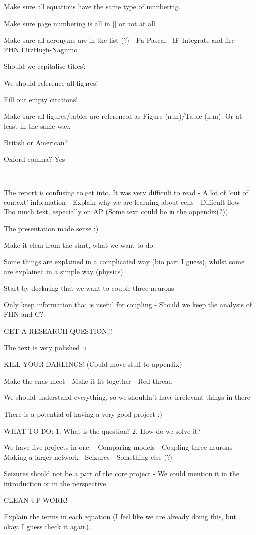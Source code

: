 Make sure all equations have the same type of numbering.

Make sure page numbering is all in [] or not at all

Make sure all acronyms are in the list (?)
    - Pa    Pascal
    - IF    Integrate and fire
    - FHN   FitzHugh-Nagumo

Should we capitalise titles?

We should reference all figures!

Fill out empty citations!

Make sure all figures/tables are referenced as Figure (n.m)/Table (n.m). Or at least in the same way.

British or American?

Oxford comma? Yes

---------------------------------------

The report is confusing to get into. It was very difficult to read
    - A lot of 'out of context' information
    - Explain why we are learning about cells
    - Difficult flow
    - Too much text, especially on AP (Some text could be in    the appendix(?))

The presentation made sense :)

Make it clear from the start, what we want to do

Some things are explained in a complicated way (bio part I guess), whilst some are explained in a simple way (physics)

Start by declaring that we want to couple three neurons 

Only keep information that is useful for coupling
    - Should we keep the analysis of FHN and C?

GET A RESEARCH QUESTION!!!

The text is very polished :)

KILL YOUR DARLINGS! (Could move stuff to appendix)

Make the ends meet
    - Make it fit together 
    - Red thread

We should understand everything, so we shouldn't have irrelevant things in there

There is a potential of having a very good project :)

WHAT TO DO:
    1. What is the question?
    2. How do we solve it?

We have five projects in one:
    - Comparing models
    - Coupling three neurons
    - Making a larger network
    - Seizures
    - Something else (?)

Seizures should not be a part of the core project
    - We could mention it in the introduction or in the         perspective 

CLEAN UP WORK!

Explain the terms in each equation (I feel like we are already doing this, but okay. I guess check it again).